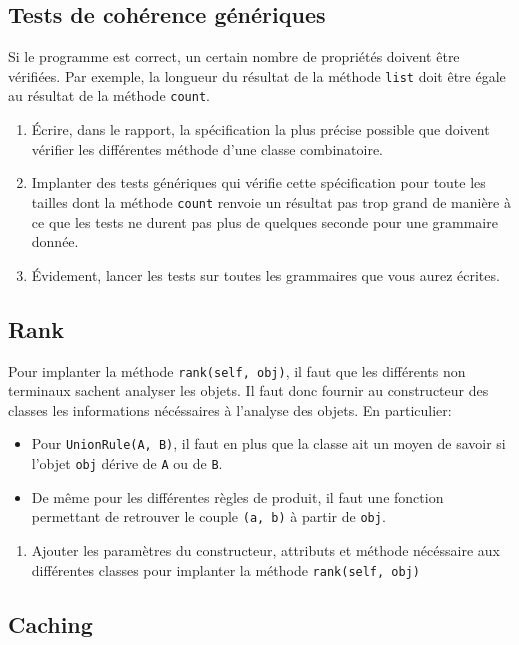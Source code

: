 \documentclass[11pt]{article}
\newcounter{asuivre}
\newenvironment{asks}{\begin{enumerate}\setcounter{enumi}{\theasuivre}}%
                       {\setcounter{asuivre}{\theenumi}\end{enumerate}}
\begin{document}
\subsection{Tests de cohérence génériques}

Si le programme est correct, un certain nombre de propriétés doivent être
vérifiées. Par exemple, la longueur du résultat de la méthode \texttt{list}
doit être égale au résultat de la méthode \texttt{count}.
\begin{asks}
\item Écrire, dans le rapport, la spécification la plus précise possible que
  doivent vérifier les différentes méthode d'une classe combinatoire.
\item Implanter des tests génériques qui vérifie cette spécification pour
  toute les tailles dont la méthode \texttt{count} renvoie un résultat pas
  trop grand de manière à ce que les tests ne durent pas plus de quelques
  seconde pour une grammaire donnée.
\item Évidement, lancer les tests sur toutes les grammaires que vous aurez
  écrites.
\end{asks}

\subsection{Rank}

Pour implanter la méthode \texttt{rank(self, obj)}, il faut que les différents
non terminaux sachent analyser les objets. Il faut donc fournir au constructeur
des classes les informations nécéssaires à l'analyse des objets. En particulier:
\begin{itemize}
\item Pour \texttt{UnionRule(A, B)}, il faut en plus que la classe ait un
  moyen de savoir si l'objet \texttt{obj} dérive de \texttt{A} ou de
  \texttt{B}.
\item De même pour les différentes règles de produit, il faut une fonction
  permettant de retrouver le couple \texttt{(a, b)} à partir de \texttt{obj}.
\end{itemize}
\begin{asks}
\item Ajouter les paramètres du constructeur, attributs et méthode nécéssaire
  aux différentes classes pour implanter la méthode \texttt{rank(self, obj)}
\end{asks}

\subsection{Caching}
\end{document}
